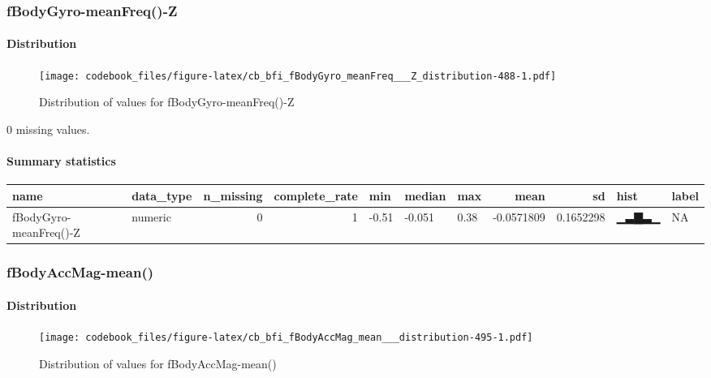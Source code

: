 \documentclass[
]{article}
\begin{document}
\hypertarget{fBodyGyro_meanFreq___Z}{%
\subsubsection{fBodyGyro-meanFreq()-Z}\label{fBodyGyro_meanFreq___Z}}

\hypertarget{fBodyGyro_meanFreq___Z_distribution}{%
\paragraph{Distribution}\label{fBodyGyro_meanFreq___Z_distribution}}

\begin{figure}
\centering
\texttt{[image: codebook\_files/figure-latex/cb\_bfi\_fBodyGyro\_meanFreq\_\_\_Z\_distribution-488-1.pdf]}
\caption{Distribution of values for fBodyGyro-meanFreq()-Z}
\end{figure}

0 missing values.

\hypertarget{fBodyGyro_meanFreq___Z_summary}{%
\paragraph{Summary statistics}\label{fBodyGyro_meanFreq___Z_summary}}

\begin{longtable}[]{@{}llrrlllrrll@{}}
\toprule
name & data\_type & n\_missing & complete\_rate & min & median & max &
mean & sd & hist & label \\
\midrule
\endhead
fBodyGyro-meanFreq()-Z & numeric & 0 & 1 & -0.51 & -0.051 & 0.38 &
-0.0571809 & 0.1652298 & ▁▃▇▃▁ & NA \\
\bottomrule
\end{longtable}

\hypertarget{fBodyAccMag_mean__}{%
\subsubsection{fBodyAccMag-mean()}\label{fBodyAccMag_mean__}}

\hypertarget{fBodyAccMag_mean___distribution}{%
\paragraph{Distribution}\label{fBodyAccMag_mean___distribution}}

\begin{figure}
\centering
\texttt{[image: codebook\_files/figure-latex/cb\_bfi\_fBodyAccMag\_mean\_\_\_distribution-495-1.pdf]}
\caption{Distribution of values for fBodyAccMag-mean()}
\end{figure}
\end{document}
